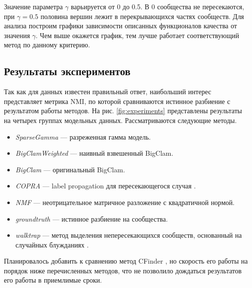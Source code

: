 \documentclass{ITaSconf}
\begin{document}
Значение параметра $\gamma$ варьируется от 0 до 0.5. 
В 0 сообщества не пересекаются, при $\gamma=0.5$ половина вершин лежит в перекрывающихся частях сообществ.
Для анализа построим графики зависимости описанных функционалов качества от значения $\gamma$. 
Чем выше окажется график, тем лучше работает соответствующий метод по данному критерию.

\subsection{Результаты экспериментов}

Так как для данных известен правильный ответ, наибольший интерес представляет метрика NMI, по которой сравниваются истинное разбиение с результатом работы методов. На рис. \ref{fig:experiments} представлены результаты на четырех группах модельных данных.
Рассматриваются следующие методы.

\begin{itemize}[label={}, leftmargin=*]
	\item \textit{SparseGamma} --- разреженная гамма модель.
	\item \textit{BigClamWeighted} --- наивный взвешенный BigClam.
	\item \textit{BigClam} --- оригинальный BigClam.
	\item \textit{COPRA} --- label propagation для пересекающегося случая \cite{gregory2010finding}.
	\item \textit{NMF} --- неотрицательное матричное разложение с квадратичной нормой.
	\item \textit{groundtruth} --- истинное разбиение на сообщества.
	\item \textit{walktrap} --- метод выделения непересекающихся сообществ, основанный на случайных блужданиях \cite{Pascal05}.
\end{itemize}
Планировалось добавить к сравнению метод CFinder \cite{palla2005uncovering}, но скорость его работы на порядок ниже перечисленных методов, что не позволило дождаться результатов его работы в приемлимые сроки.
\end{document}
